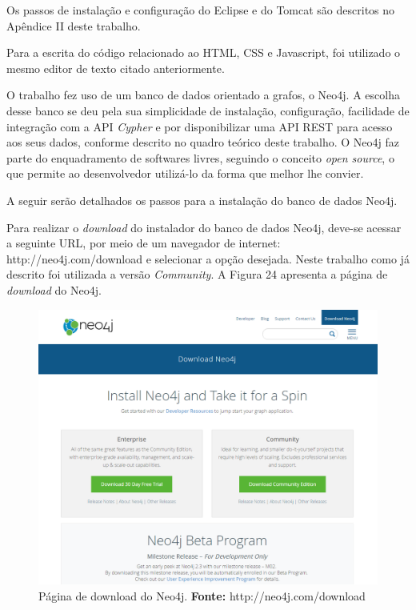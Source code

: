 \par Os passos de instalação e configuração do Eclipse e do Tomcat são descritos no Apêndice II deste trabalho.

\par Para a escrita do código relacionado ao HTML, CSS e Javascript, foi utilizado o mesmo editor de texto citado anteriormente.

\par O trabalho fez uso de um banco de dados orientado a grafos, o Neo4j. A escolha desse banco se deu pela sua simplicidade de instalação, configuração, facilidade de integração com a API \textit{Cypher} e por disponibilizar uma API REST para acesso aos seus dados, conforme descrito no quadro teórico deste trabalho. O Neo4j faz parte do enquadramento de softwares livres, seguindo o conceito \textit{open source}, o que permite ao desenvolvedor utilizá-lo da forma que melhor lhe convier. 


\par A seguir serão detalhados os passos para a instalação do banco de dados Neo4j.

\par Para realizar o \textit{download} do instalador do banco de dados Neo4j, deve-se acessar a seguinte URL, por meio de um  navegador de internet: http://neo4j.com/download e selecionar a opção desejada. Neste trabalho como já descrito foi utilizada a versão \textit{Community}. A Figura 24 apresenta a página de \textit{download} do Neo4j.

\newpage
\begin{figure}[h!]
	\centerline{\includegraphics[scale=0.4]{./imagens/download-neo4j.png}}
	\caption[Página de download do Neo4j]
	{Página de download do Neo4j. \textbf{Fonte:} http://neo4j.com/download}
	\label{fig:exemplo1}
\end{figure}

